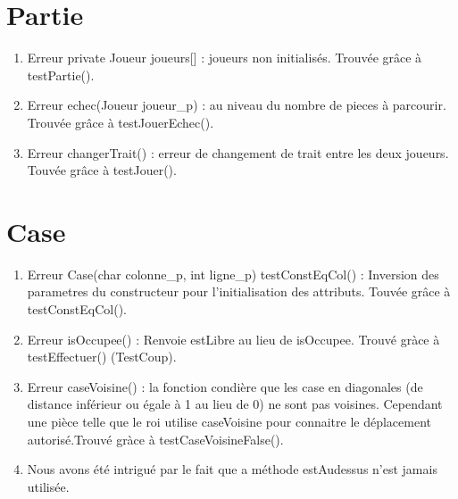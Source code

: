 \section{Partie}
\begin{enumerate}
\item
 Erreur private Joueur joueurs[] : joueurs non initialisés. Trouvée grâce à testPartie().
\item
Erreur echec(Joueur joueur\_p) :  au niveau du nombre de pieces à parcourir. Trouvée grâce à testJouerEchec().
\item
Erreur changerTrait() : erreur de changement de trait entre les deux joueurs. Touvée grâce à testJouer().
\end{enumerate}

\section{Case}
\begin{enumerate}
\item
 Erreur Case(char colonne\_p, int ligne\_p) testConstEqCol() : Inversion des parametres du constructeur pour l'initialisation des attributs. Touvée grâce à testConstEqCol().
\item
Erreur isOccupee() :  Renvoie estLibre au lieu de isOccupee. Trouvé gràce à testEffectuer() (TestCoup).
\item	
Erreur caseVoisine() : la fonction condière que les case en diagonales (de distance inférieur ou égale à 1 au lieu de 0) ne sont pas voisines. Cependant une pièce telle que le roi utilise caseVoisine pour connaitre le déplacement autorisé.Trouvé gràce à testCaseVoisineFalse().
\item
Nous avons été intrigué par le fait que a méthode estAudessus n'est jamais utilisée. 
\end{enumerate}
